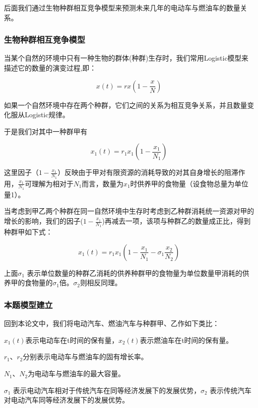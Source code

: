 \documentclass[]{article}
\begin{document}
后面我们通过生物种群相互竞争模型来预测未来几年的电动车与燃油车的数量关系。

\subsubsection{生物种群相互竞争模型}

当某个自然的环境中只有一种生物的群体(种群)生存时，我们常用Logistic模型来描述它的数量的演变过程,即：

\begin{dmath}
  x(t)=rx(1-\frac{x}{N})
\end{dmath}

如果一个自然环境中存在两个种群，它们之间的关系为相互竞争关系，并且数量变化服从Logistic规律。

于是我们对其中一种群甲有

\begin{dmath}
  x_1(t)=r_1x_1(1-\frac{x_1}{N_1})
\end{dmath}

这里因子（\(1-\frac{x_1}{N_1}\)）反映由于甲对有限资源的消耗导致的对其自身增长的阻滞作用，$\frac{x_1}{N_1}$可理解为相对于$N_1$而言，数量为$x_1$时供养甲的食物量（设食物总量为单位量1）。

当考虑到甲乙两个种群在同一自然环境中生存时考虑到乙种群消耗统一资源对甲的增长的影响，我们的因子($1-\frac{x_1}{N_1}$)再减去一项，该项与种群乙的数量成正比，得到种群甲如下式：

\begin{dmath}x_1(t)=r_1x_1\left(1-\frac{x_1}{N_1}-\sigma_1\frac{x_2}{N_2}\right)\end{dmath}

上面$\sigma_1$
  表示单位数量的种群乙消耗的供养种群甲的食物量为单位数量甲消耗的供养甲的食物量的$\sigma_1$倍。$\sigma_2$则相反同理。

\subsubsection{本题模型建立}

回到本论文中，我们将电动汽车、燃油汽车与种群甲、乙作如下类比：

$x_1(t)$表示电动车在t时间的保有量，$x_2(t)$表示燃油车在t时间的保有量。

$r_1$、$r_2$分别表示电动车与燃油车的固有增长率。

$N_1$、$N_2$为电动车与燃油车的最大容量。

$\sigma_1$
  表示电动汽车相对于传统汽车在同等经济发展下的发展优势，$\sigma_2$
表示传统汽车对电动汽车同等经济发展下的发展优势。
\end{document}
